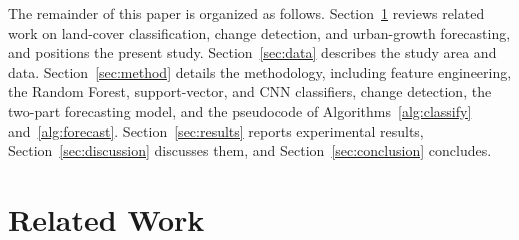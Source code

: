\documentclass[journal]{IEEEtran}
\begin{document}
The remainder of this paper is organized as follows. Section~\ref{sec:related} reviews related work on land-cover classification, change detection, and urban-growth forecasting, and positions the present study. Section~\ref{sec:data} describes the study area and data. Section~\ref{sec:method} details the methodology, including feature engineering, the Random Forest, support-vector, and CNN classifiers, change detection, the two-part forecasting model, and the pseudocode of Algorithms~\ref{alg:classify} and~\ref{alg:forecast}. Section~\ref{sec:results} reports experimental results, Section~\ref{sec:discussion} discusses them, and Section~\ref{sec:conclusion} concludes.

\section{Related Work}\label{sec:related}
\end{document}
